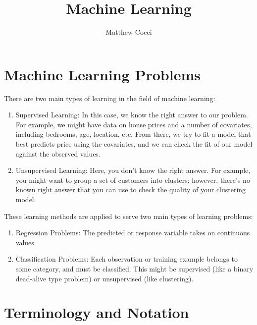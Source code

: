 \documentclass[12pt]{article}
\author{Matthew Cocci}
\title{Machine Learning}
\date{}
\begin{document}
\maketitle


\section{Machine Learning Problems}

There are two main types of learning in the field of machine learning:
\begin{enumerate}

   \item Supervised Learning: In this case, we know the right answer
      to our problem.  For example, we might have data on house prices
      and a number of covariates, including bedrooms, age, location,
      etc.  From there, we try to fit a model that best predicts price
      using the covariates, and we can check the fit of our model
      against the observed values.

   \item Unsupervised Learning: Here, you don't know the right answer.
      For example, you might want to group a set of customers
      into clusters; however, there's no known right answer that you can
      use to check the quality of your clustering model.

\end{enumerate}
These learning methods are applied to serve two main types of
learning problems:
\begin{enumerate}
   \item Regression Problems: The predicted or response variable
      takes on continuous values.
   \item Classification Problems: Each observation or training example
      belongs to some category, and must be classified. This might
      be supervised (like a binary dead-alive type problem) or
      unsupervised (like clustering).
\end{enumerate}



\section{Terminology and Notation}
\end{document}
